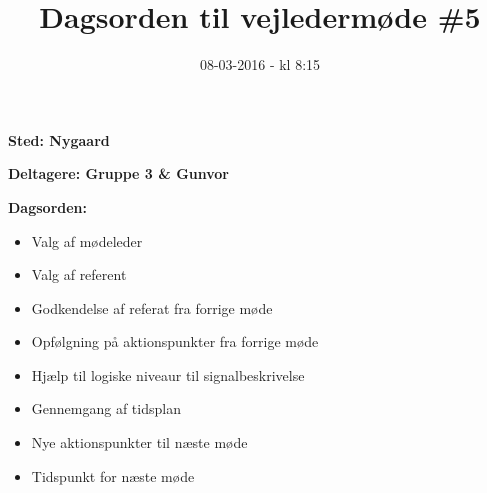 \documentclass{article}
\title{Dagsorden til vejledermøde \#5}
\date{08-03-2016 - kl 8:15}
\begin{document}
	\maketitle

	\textbf{Sted: Nygaard}
	
	\textbf{Deltagere: Gruppe 3 \& Gunvor}
	
	\textbf{Dagsorden:}
	\begin{itemize}
		\item Valg af mødeleder
		\item Valg af referent
		\item Godkendelse af referat fra forrige møde 
		\item Opfølgning på aktionspunkter fra forrige møde
		\item Hjælp til logiske niveaur til signalbeskrivelse
		\item Gennemgang af tidsplan
		\item Nye aktionspunkter til næste møde
		\item Tidspunkt for næste møde
	\end{itemize}
\end{document}
